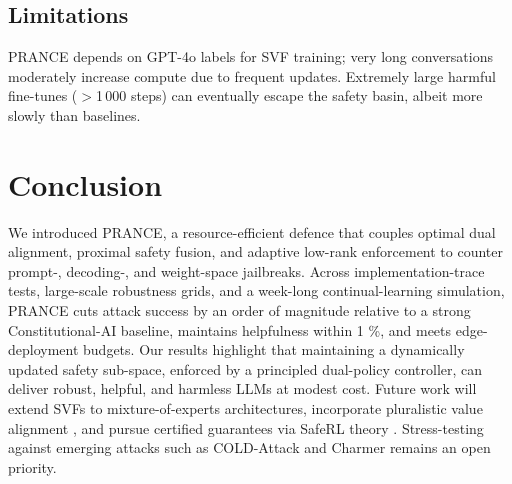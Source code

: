 \documentclass{article}
\begin{document}
\subsection{Limitations}
PRANCE depends on GPT-4o labels for SVF training; very long conversations moderately increase compute due to frequent updates. Extremely large harmful fine-tunes ($>$1\,000 steps) can eventually escape the safety basin, albeit more slowly than baselines.

\section{Conclusion}
We introduced PRANCE, a resource-efficient defence that couples optimal dual alignment, proximal safety fusion, and adaptive low-rank enforcement to counter prompt-, decoding-, and weight-space jailbreaks. Across implementation-trace tests, large-scale robustness grids, and a week-long continual-learning simulation, PRANCE cuts attack success by an order of magnitude relative to a strong Constitutional-AI baseline, maintains helpfulness within 1 \%, and meets edge-deployment budgets. Our results highlight that maintaining a dynamically updated safety sub-space, enforced by a principled dual-policy controller, can deliver robust, helpful, and harmless LLMs at modest cost.
Future work will extend SVFs to mixture-of-experts architectures, incorporate pluralistic value alignment \cite{sorensen-2024-position}, and pursue certified guarantees via SafeRL theory \cite{ji-2023-safety}. Stress-testing against emerging attacks such as COLD-Attack and Charmer remains an open priority.




\end{document}

